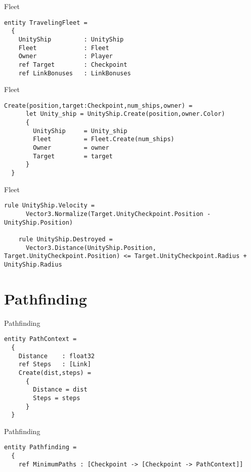 \documentclass{beamer}
\begin{document}
\begin{frame}[fragile]{Fleet}
\begin{lstlisting}[frame=shadowbox]
entity TravelingFleet =
  {
    UnityShip         : UnityShip
    Fleet             : Fleet
    Owner             : Player
    ref Target        : Checkpoint
    ref LinkBonuses   : LinkBonuses
\end{lstlisting}
\end{frame}

\begin{frame}[fragile]{Fleet}
\begin{lstlisting}[frame=shadowbox]
    Create(position,target:Checkpoint,num_ships,owner) = 
      let Unity_ship = UnityShip.Create(position,owner.Color)
      {
        UnityShip     = Unity_ship
        Fleet         = Fleet.Create(num_ships)
        Owner         = owner
        Target        = target
      }
  }
\end{lstlisting}
\end{frame}

\begin{frame}[fragile]{Fleet}
\begin{lstlisting}[frame=shadowbox]
    rule UnityShip.Velocity = 
      Vector3.Normalize(Target.UnityCheckpoint.Position - UnityShip.Position)

    rule UnityShip.Destroyed = 
      Vector3.Distance(UnityShip.Position, Target.UnityCheckpoint.Position) <= Target.UnityCheckpoint.Radius + UnityShip.Radius
\end{lstlisting}
\end{frame}


\section{Pathfinding}
\begin{frame}[fragile]{Pathfinding}
\begin{lstlisting}[frame=shadowbox]
entity PathContext =
  {
    Distance    : float32
    ref Steps   : [Link]
    Create(dist,steps) =
      {
        Distance = dist
        Steps = steps
      }
  }
\end{lstlisting}
\end{frame}

\begin{frame}[fragile]{Pathfinding}
\begin{lstlisting}[frame=shadowbox]
entity Pathfinding =
  {
    ref MinimumPaths : [Checkpoint -> [Checkpoint -> PathContext]]
\end{lstlisting}
\end{frame}
\end{document}
